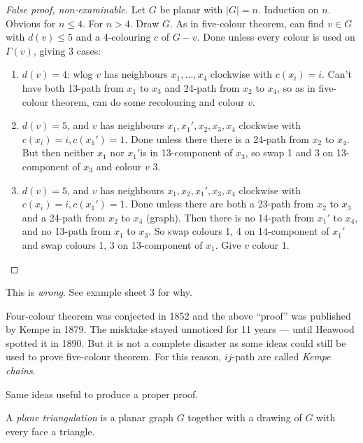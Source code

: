 \documentclass[a4paper]{article}
\begin{document}
\begin{proof}[False proof, non-examinable]
  Let \(G\) be planar with \(|G| = n\). Induction on \(n\). Obvious for \(n \leq 4\). For \(n > 4\). Draw \(G\). As in five-colour theorem, can find \(v \in G\) with \(d(v) \leq 5\) and a 4-colouring \(c\) of \(G - v\). Done unless every colour is used on \(\Gamma(v)\), giving 3 cases:
  \begin{enumerate}
  \item \(d(v) = 4\): wlog \(v\) has neighbours \(x_1, \dots, x_4\) clockwise with \(c(x_i) = i\). Can't have both 13-path from \(x_1\) to \(x_3\) and 24-path from \(x_2\) to \(x_4\), so as in five-colour theorem, can do some recolouring and colour \(v\).
  \item \(d(v) = 5\), and \(v\) has neighbours \(x_1, x_1', x_2, x_3, x_4\) clockwise with \(c(x_i) = i, c(x_1') = 1\). Done unless there there is a 24-path from \(x_2\) to \(x_4\). But then neither \(x_1\) nor \(x_1'\)is in 13-component of \(x_3\), so swap 1 and 3 on 13-component of \(x_3\) and colour \(v\) 3.
  \item \(d(v) = 5\), and \(v\) has neighbours \(x_1, x_2, x_1', x_3, x_4\) clockwise with \(c(x_i) = i, c(x_1') = 1\). Done unless there are both a 23-path from \(x_2\) to \(x_3\) and a 24-path from \(x_2\) to \(x_4\) (graph). Then there is no 14-path from \(x_1'\) to \(x_4\), and no 13-path from \(x_1\) to \(x_3\). So swap colours 1, 4 on 14-component of \(x_1'\) and swap colours 1, 3 on 13-component of \(x_1\). Give \(v\) colour 1.
  \end{enumerate}
\end{proof}

\begin{remark}
  This is \emph{wrong}. See example sheet 3 for why.
  
  Four-colour theorem was conjected in 1852 and the above ``proof'' was published by Kempe in 1879. The misktake stayed unnoticed for 11 years --- until Heawood spotted it in 1890. But it is not a complete disaster as some ideas could still be used to prove five-colour theorem. For this reason, \(ij\)-path are called \emph{Kempe chains}.
\end{remark}

Same ideas useful to produce a proper proof.

\begin{definition}
  A \emph{plane triangulation} is a planar graph \(G\) together with a drawing of \(G\) with every face a triangle.
\end{definition}
\end{document}

